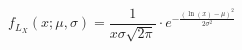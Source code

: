 \begin{equation}
{\displaystyle f_{L_X}(x;\mu ,\sigma )={\frac {1}{x\sigma {\sqrt {2\pi }}}}\cdot e^ {-\frac {\left(\ln(x)-\mu \right)^{2}}{2\sigma ^{2}}}}
\label{eq:Lognormal}
\end{equation}









